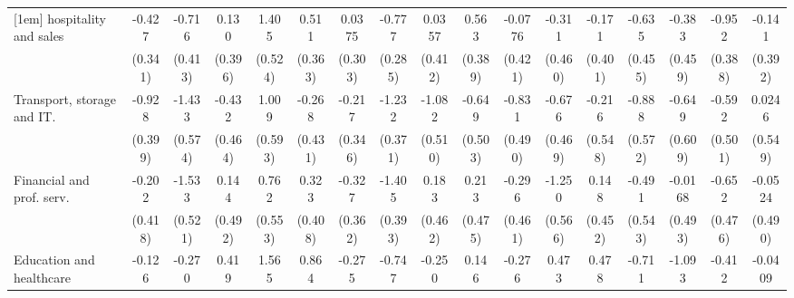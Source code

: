{\begin{tabular}{l*{16}{c}}
[1em]
hospitality and sales&      -0.427         &      -0.716         &       0.130         &       1.405\sym{**} &       0.511         &      0.0375         &      -0.777\sym{**} &      0.0357         &       0.563         &     -0.0776         &      -0.311         &      -0.171         &      -0.635         &      -0.383         &      -0.952\sym{*}  &      -0.141         \\
                    &     (0.341)         &     (0.413)         &     (0.396)         &     (0.524)         &     (0.363)         &     (0.303)         &     (0.285)         &     (0.412)         &     (0.389)         &     (0.421)         &     (0.460)         &     (0.401)         &     (0.455)         &     (0.459)         &     (0.388)         &     (0.392)         \\
[1em]
Transport, storage and IT.&      -0.928\sym{*}  &      -1.433\sym{*}  &      -0.432         &       1.009         &      -0.268         &      -0.217         &      -1.232\sym{***}&      -1.082\sym{*}  &      -0.649         &      -0.831         &      -0.676         &      -0.216         &      -0.888         &      -0.649         &      -0.592         &      0.0246         \\
                    &     (0.399)         &     (0.574)         &     (0.464)         &     (0.593)         &     (0.431)         &     (0.346)         &     (0.371)         &     (0.510)         &     (0.503)         &     (0.490)         &     (0.469)         &     (0.548)         &     (0.572)         &     (0.609)         &     (0.501)         &     (0.549)         \\
[1em]
Financial and prof. serv.&      -0.202         &      -1.533\sym{**} &       0.144         &       0.762         &       0.323         &      -0.327         &      -1.405\sym{***}&       0.183         &       0.213         &      -0.296         &      -1.250\sym{*}  &       0.148         &      -0.491         &     -0.0168         &      -0.652         &     -0.0524         \\
                    &     (0.418)         &     (0.521)         &     (0.492)         &     (0.553)         &     (0.408)         &     (0.362)         &     (0.393)         &     (0.462)         &     (0.475)         &     (0.461)         &     (0.566)         &     (0.452)         &     (0.543)         &     (0.493)         &     (0.476)         &     (0.490)         \\
[1em]
Education and healthcare&      -0.126         &      -0.270         &       0.419         &       1.565\sym{**} &       0.864\sym{*}  &      -0.275         &      -0.747         &      -0.250         &       0.146         &      -0.276         &       0.473         &       0.478         &      -0.711         &      -1.093\sym{*}  &      -0.412         &     -0.0409         \\

\end{tabular}}
